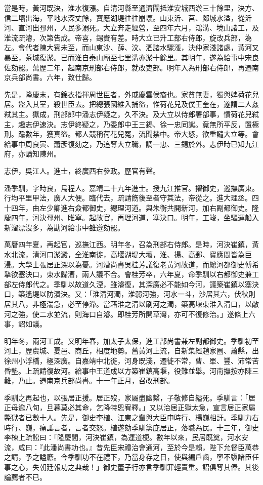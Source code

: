 \begin{pinyinscope}
{{當是時，黃河既決，淮水復漲。自清河縣至通濟閘抵淮安城西淤三十餘里，決方、信二壩出海，平地水深丈餘，寶應湖堤往往崩壞。山東沂、莒、郯城水溢，從沂河、直河出邳州，人民多溺死。大立奔走經營，至四年六月，鴻溝、境山諸工，及淮流疏濬，次第告成。帝喜，錫賚有差。時大立已升工部右侍郎，旋改兵部，為左。會代者陳大賓未至，而山東沙、薛、汶、泗諸水驟漲，決仲家淺諸處，黃河又暴至，茶城復淤。已而淮自泰山廟至七里溝亦淤十餘里。其明年，遂為給事中宋良佐劾罷。萬歷二年，起南京刑部右侍郎，就改吏部。明年入為刑部右侍郎，再遷南京兵部尚書。六年，致仕歸。

先是，隆慶末，有錦衣指揮周世臣者，外戚慶雲侯裔也。家貧無妻，獨與婢荷花兒居。盜入其室，殺世臣去。把總張國維入捕盜，惟荷花兒及僕王奎在，遂謂二人姦弒其主。獄成，刑部郎中潘志伊疑之，久不決。及大立以侍郎署部事，憤荷花兒弒主，趣志伊速決。志伊終疑之，乃委郎中王三錫、徐一忠同讞。竟無所平反，置極刑。踰數年，獲真盜。都人競稱荷花兒冤，流聞禁中。帝大怒，欲重譴大立等。會給事中周良寅、蕭彥復劾之，乃追奪大立職，調一忠、三錫於外。志伊時已知九江府，亦謫知陳州。

志伊，吳江人。進士，終廣西右參政。歷官有聲。

潘季馴，字時良，烏程人。嘉靖二十九年進士。授九江推官。擢御史，巡撫廣東。行均平里甲法，廣人大便。臨代去，疏請飭後至者守其法，帝從之。進大理丞。四十四年，由左少卿進右僉都御史，總理河道。與朱衡共開新河，加右副都御史。隆慶四年，河決邳州、睢寧。起故官，再理河道，塞決口。明年，工竣，坐驅運船入新溜漂沒多，為勘河給事中雒遵劾罷。

萬曆四年夏，再起官，巡撫江西。明年冬，召為刑部右侍郎。是時，河決崔鎮，黃水北流，清河口淤澱，全淮南徙，高堰湖堤大壞，淮、揚、高郵、寶應間皆為巨浸。大學士張居正深以為憂。河漕尚書吳桂芳議復老黃河故道，而總河都御史傅希摯欲塞決口，束水歸漕，兩人議不合。會桂芳卒，六年夏，命季馴以右都御史兼工部左侍郎代之。季馴以故道久湮，雖濬復，其深廣必不能如今河，議築崔鎮以塞決口，築遙堤以防潰決。又：「淮清河濁，淮弱河強，河水一斗，沙居其六，伏秋則居其八，非極湍急，必至停滯。當藉淮之清以刷河之濁，築高堰束淮入清口，以敵河之強，使二水並流，則海口自濬。即桂芳所開草灣，亦可不復修治。」遂條上六事，詔如議。

明年冬，兩河工成。又明年春，加太子太保，進工部尚書兼左副都御史。季馴初至河上，歷虞城、夏邑、商丘，相度地勢。舊黃河上流，自新集經趙家圈、蕭縣，出徐州小浮橋，極深廣。自嘉靖中北徙，河身既淺，遷徙不常，曹、單、豐、沛常苦昏墊。上疏請復故河。給事中王道成以方築崔鎮高堰，役難並舉。河南撫按亦陳三難，乃止。遷南京兵部尚書。十一年正月，召改刑部。

季馴之再起也，以張居正援。居正歿，家屬盡幽繫，子敬修自縊死。季馴言：「居正母逾八旬，旦暮莫必其命，乞降特恩宥釋。」又以治居正獄太急，宣言居正家屬斃獄者已數十人。先是，御史李植、江東之輩與大臣申時行、楊巍相訐。季馴力右時行、巍，痛詆言者，言者交怒。植遂劾季馴黨庇居正，落職為民。十三年，御史李棟上疏訟曰：「隆慶間，河決崔鎮，為運道梗。數年以來，民居既奠，河水安流，咸曰：『此潘尚書功也。』昔先臣宋禮治會通河，至於今是賴，陛下允督臣萬恭之請，予之謚廕。今季馴功不在禮下，乃當身存之日，使與編戶齒，寧不隳諸臣任事之心，失朝廷報功之典哉！」御史董子行亦言季馴罪輕責重。詔俱奪其俸。其後論薦者不已。

}}
\end{pinyinscope}
